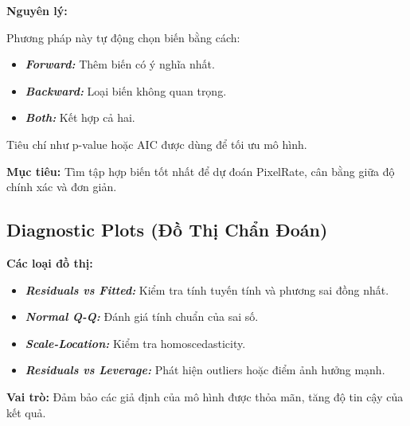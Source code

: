 \textbf{Nguyên lý:}

Phương pháp này tự động chọn biến bằng cách:

\begin{itemize}
    \item \textbf{\textit{Forward:}} Thêm biến có ý nghĩa nhất.
    \item \textbf{\textit{Backward:}} Loại biến không quan trọng.
    \item \textbf{\textit{Both:}} Kết hợp cả hai.
\end{itemize}

Tiêu chí như p-value hoặc AIC được dùng để tối ưu mô hình.


\textbf{Mục tiêu:} Tìm tập hợp biến tốt nhất để dự đoán PixelRate, cân bằng giữa độ chính xác và đơn giản.


\subsection{Diagnostic Plots (Đồ Thị Chẩn Đoán)}

\textbf{Các loại đồ thị:}

\begin{itemize}
    \item \textbf{\textit{Residuals vs Fitted: }}Kiểm tra tính tuyến tính và phương sai đồng nhất.
    \item \textbf{\textit{Normal Q-Q:}} Đánh giá tính chuẩn của sai số.
    \item \textbf{\textit{Scale-Location:}} Kiểm tra homoscedasticity.
    \item \textbf{\textit{Residuals vs Leverage:}} Phát hiện outliers hoặc điểm ảnh hưởng mạnh.
\end{itemize}


\textbf{Vai trò:} Đảm bảo các giả định của mô hình được thỏa mãn, tăng độ tin cậy của kết quả.